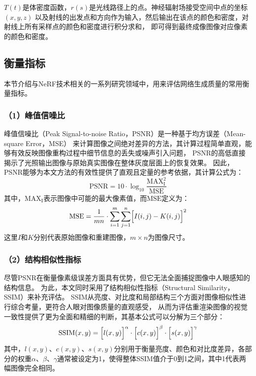 $T\left(t\right)$是体密度函数，$r\left(s\right)$是光线路径上的点。神经辐射场接受空间中点的坐标$\left(x,y,z\right)$
以及射线的出发点和方向作为输入，然后输出在该点的颜色和密度，对射线上所有采样点的颜色和密度进行积分求和，
即可得到最终成像图像对应像素的颜色和密度。

\subsection{衡量指标}

本节介绍与NeRF技术相关的一系列研究领域中，用来评估网络生成质量的常用衡量指标。

\subsubsection*{（1）峰值信噪比} 

峰值信噪比（Peak Signal-to-noise Ratio，PSNR）是一种基于均方误差（Mean-square Error，MSE）
来计算图像之间绝对差异的方法，其计算过程简单直观，能够有效反映图像重构过程中细节信息的丢失或噪声引入问题，
PSNR的高低直接揭示了光照输出图像与原始真实图像在整体灰度层面上的恢复效果。
因此，PSNR能够为本文方法的有效性提供了直观且定量的参考依据，其计算公式为：
\begin{equation}\label{eq:PSNR}
\mathrm{PSNR}=10\cdot\log_{10}\frac{\mathrm{MAX}_\mathrm{I}^2}{\mathrm{MSE}}
\end{equation}
其中，$\mathrm{MAX}_\mathrm{I}$表示图像中可能的最大像素值，而$\mathrm{MSE}$定义为：
\begin{equation}\label{eq:MSE}
\mathrm{MSE}=\frac{1}{mn}\cdot\sum_{i=1}^{m}\sum_{j=1}^{n}\Bigl[I(i,j)-K(i,j)\Bigr]^2
\end{equation}
这里$I$和$K$分别代表原始图像和重建图像，$m\times n$为图像尺寸。

\subsubsection*{（2）结构相似性指标} 

尽管PSNR在衡量像素级误差方面具有优势，但它无法全面捕捉图像中人眼感知的结构信息。
为此，本文同时采用了结构相似性指标（Structural Similarity，SSIM）来补充评估。
SSIM从亮度、对比度和局部结构三个方面对图像相似性进行综合考量，更符合人眼对图像质量的直观感受，
从而为评估重渲染图像的视觉一致性提供了更为全面和精细的判断，其基本公式可以分解为三个部分：
\begin{equation}\label{eq:SSIM}
\mathrm{SSIM}(x,y)=\Bigl[l(x,y)\Bigr]^\alpha\cdot\Bigl[c(x,y)\Bigr]^\beta\cdot\Bigl[s(x,y)\Bigr]^\gamma
\end{equation}
其中，$l(x,y)$、$c(x,y)$、$s(x,y)$分别用于衡量亮度、颜色和对比度差异，各部分的权重$\alpha$、$\beta$、$\gamma$通常被设定为1，使得整体SSIM值介于0到1之间，其中1代表两幅图像完全相同。

